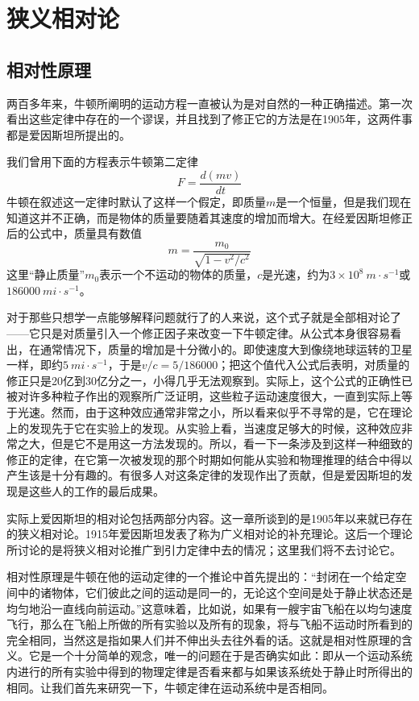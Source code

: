 \chapter{狭义相对论}

\section{相对性原理}

两百多年来，牛顿所阐明的运动方程一直被认为是对自然的一种正确描述。第一次看出这些定律中存在的一个谬误，并且找到了修正它的方法是在1905年，这两件事都是爱因斯坦所提出的。

我们曾用下面的方程表示牛顿第二定律
\begin{equation*}
    F=\frac{d(mv)}{dt}
\end{equation*}
牛顿在叙述这一定律时默认了这样一个假定，即质量$m$是一个恒量，但是我们现在知道这并不正确，而是物体的质量要随着其速度的增加而增大。在经爱因斯坦修正后的公式中，质量具有数值
\begin{equation}
    \label{Eq:I:15:1}
    m=\frac{m_0}{\sqrt{1-v^2/c^2}}
\end{equation}
这里“静止质量”$m_0$表示一个不运动的物体的质量，$c$是光速，约为$3 \times 10^8~m \cdot s^{-1}$或$186000~mi \cdot s^{-1}$。

对于那些只想学一点能够解释问题就行了的人来说，这个式子就是全部相对论了——它只是对质量引入一个修正因子来改变一下牛顿定律。从公式本身很容易看出，在通常情况下，质量的增加是十分微小的。即使速度大到像绕地球运转的卫星一样，即约$5~mi \cdot s^{-1}$，于是$v/c=5/186000$；把这个值代入公式后表明，对质量的修正只是20亿到30亿分之一，小得几乎无法观察到。实际上，这个公式的正确性已被对许多种粒子作出的观察所广泛证明，这些粒子运动速度很大，一直到实际上等于光速。然而，由于这种效应通常非常之小，所以看来似乎不寻常的是，它在理论上的发现先于它在实验上的发现。从实验上看，当速度足够大的时候，这种效应非常之大，但是它不是用这一方法发现的。所以，看一下一条涉及到这样一种细致的修正的定律，在它第一次被发现的那个时期如何能从实验和物理推理的结合中得以产生该是十分有趣的。有很多人对这条定律的发现作出了贡献，但是爱因斯坦的发现是这些人的工作的最后成果。

实际上爱因斯坦的相对论包括两部分内容。这一章所谈到的是1905年以来就已存在的狭义相对论。1915年爱因斯坦发表了称为广义相对论的补充理论。这后一个理论所讨论的是将狭义相对论推广到引力定律中去的情况；这里我们将不去讨论它。

相对性原理是牛顿在他的运动定律的一个推论中首先提出的：“封闭在一个给定空间中的诸物体，它们彼此之间的运动是同一的，无论这个空间是处于静止状态还是均匀地沿一直线向前运动。”这意味着，比如说，如果有一艘宇宙飞船在以均匀速度飞行，那么在飞船上所做的所有实验以及所有的现象，将与飞船不运动时所看到的完全相同，当然这是指如果人们并不伸出头去往外看的话。这就是相对性原理的含义。它是一个十分简单的观念，唯一的问题在于是否确实如此：即从一个运动系统内进行的所有实验中得到的物理定律是否看来都与如果该系统处于静止时所得出的相同。让我们首先来研究一下，牛顿定律在运动系统中是否相同。


